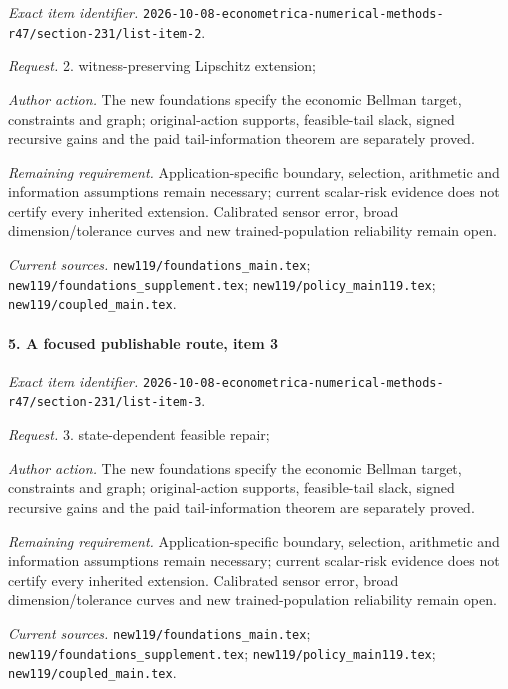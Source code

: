 \emph{Exact item identifier.} \nolinkurl{2026-10-08-econometrica-numerical-methods-r47/section-231/list-item-2}.

\par\emph{Request.} 2. witness-preserving Lipschitz extension;

\par\emph{Author action.} The new foundations specify the economic Bellman target, constraints and graph; original-action supports, feasible-tail slack, signed recursive gains and the paid tail-information theorem are separately proved.

\par\emph{Remaining requirement.} Application-specific boundary, selection, arithmetic and information assumptions remain necessary; current scalar-risk evidence does not certify every inherited extension. Calibrated sensor error, broad dimension/\allowbreak{}tolerance curves and new trained-population reliability remain open.

\par\emph{Current sources.} \nolinkurl{new119/foundations_main.tex}; \nolinkurl{new119/foundations_supplement.tex}; \nolinkurl{new119/policy_main119.tex}; \nolinkurl{new119/coupled_main.tex}.

\paragraph{5. A focused publishable route, item 3}

\emph{Exact item identifier.} \nolinkurl{2026-10-08-econometrica-numerical-methods-r47/section-231/list-item-3}.

\par\emph{Request.} 3. state-dependent feasible repair;

\par\emph{Author action.} The new foundations specify the economic Bellman target, constraints and graph; original-action supports, feasible-tail slack, signed recursive gains and the paid tail-information theorem are separately proved.

\par\emph{Remaining requirement.} Application-specific boundary, selection, arithmetic and information assumptions remain necessary; current scalar-risk evidence does not certify every inherited extension. Calibrated sensor error, broad dimension/\allowbreak{}tolerance curves and new trained-population reliability remain open.

\par\emph{Current sources.} \nolinkurl{new119/foundations_main.tex}; \nolinkurl{new119/foundations_supplement.tex}; \nolinkurl{new119/policy_main119.tex}; \nolinkurl{new119/coupled_main.tex}.

